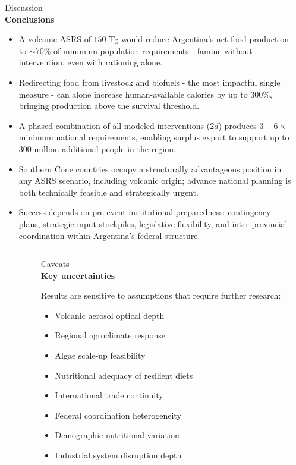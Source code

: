 \documentclass[final]{beamer}
\newlength{\sepwidth}
\newlength{\colwidth}
\newenvironment{labelblock}[2]{%
  \begin{block}{%
      {\small\color{structure.fg!70!bg}#1}%
      \\[2pt]                                  %
      {\large\bfseries#2}%
      }%
      }{%
  \end{block}%
  }
\newcommand{\separatorcolumn}{\begin{column}{\sepwidth}\end{column}}
\begin{document}
\begin{frame}[t]
\begin{columns}[t]
    \begin{column}{\colwidth}
      \begin{labelblock}{Discussion}{Conclusions}
        \begin{itemize}
          \item A volcanic ASRS of $150$ Tg would reduce Argentina's net food production to $\sim 70\%$ of minimum population requirements - famine without intervention, even with rationing alone.
          \item Redirecting food from livestock and biofuels - the most impactful single measure - can alone increase human-available calories by up to $300\%$, bringing production above the survival threshold.
          \item A phased combination of all modeled interventions ($2d$) produces $3-6\times$ minimum national requirements, enabling surplus export to support up to $300$ million additional people in the region.
          \item Southern Cone countries occupy a structurally advantageous position in any ASRS scenario, including volcanic origin; advance national planning is both technically feasible and strategically urgent.
          \item Success depends on pre-event institutional preparedness: contingency plans, strategic input stockpiles, legislative flexibility, and inter-provincial coordination within Argentina's federal structure.
        \end{itemize}
      \end{labelblock}
    \end{column}

    \separatorcolumn
  \end{columns}
  \vspace{0.5cm}

  \begin{columns}[t]
    \separatorcolumn

    \begin{column}{\colwidth}
      \begin{labelblock}{Caveats}{Key uncertainties}
        Results are sensitive to assumptions that require further research:
        \begin{itemize}
          \item Volcanic aerosol optical depth
          \item Regional agroclimate response
          \item Algae scale-up feasibility
          \item Nutritional adequacy of resilient diets
          \item International trade continuity
          \item Federal coordination heterogeneity
          \item Demographic nutritional variation
          \item Industrial system disruption depth
        \end{itemize}


\end{labelblock}
\end{column}
\end{columns}
\end{frame}
\end{document}
